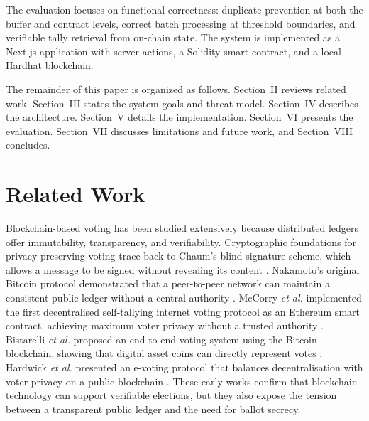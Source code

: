 \documentclass{ieeeaccess}
\begin{document}
The evaluation focuses on functional correctness: duplicate prevention at both the buffer and contract levels, correct batch processing at threshold boundaries, and verifiable tally retrieval from on-chain state. The system is implemented as a Next.js application with server actions, a Solidity smart contract, and a local Hardhat blockchain.

The remainder of this paper is organized as follows. Section~II reviews related work. Section~III states the system goals and threat model. Section~IV describes the architecture. Section~V details the implementation. Section~VI presents the evaluation. Section~VII discusses limitations and future work, and Section~VIII concludes.

\section{Related Work}
Blockchain-based voting has been studied extensively because distributed ledgers offer immutability, transparency, and verifiability. Cryptographic foundations for privacy-preserving voting trace back to Chaum's blind signature scheme, which allows a message to be signed without revealing its content \cite{Chaum1982}. Nakamoto's original Bitcoin protocol demonstrated that a peer-to-peer network can maintain a consistent public ledger without a central authority \cite{Nakamoto2008}. McCorry \emph{et al.} implemented the first decentralised self-tallying internet voting protocol as an Ethereum smart contract, achieving maximum voter privacy without a trusted authority \cite{McCorry2017}. Bistarelli \emph{et al.} proposed an end-to-end voting system using the Bitcoin blockchain, showing that digital asset coins can directly represent votes \cite{Bistarelli2017}. Hardwick \emph{et al.} presented an e-voting protocol that balances decentralisation with voter privacy on a public blockchain \cite{Hardwick2018}. These early works confirm that blockchain technology can support verifiable elections, but they also expose the tension between a transparent public ledger and the need for ballot secrecy.
\end{document}
